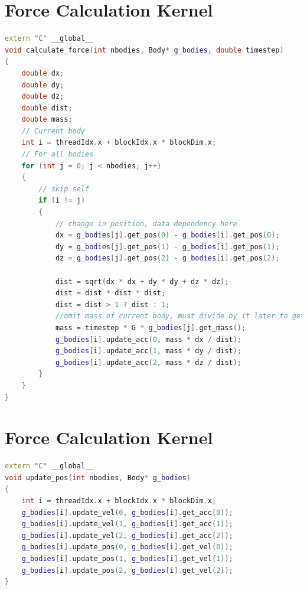 \documentclass[10pt]{IEEEtran}
\newcommand{\?}{\stackrel{?}{=}}
\begin{document}
\newpage

\nocite{*}
\newpage
\begin{appendices}
\onecolumn
\footnotesize
\section{Force Calculation Kernel}
\label{appendix:calc_force}
\begin{lstlisting}[language=C++]
extern "C" __global__
void calculate_force(int nbodies, Body* g_bodies, double timestep)
{
    double dx;
    double dy;
    double dz;
    double dist;
    double mass;
    // Current body
    int i = threadIdx.x + blockIdx.x * blockDim.x;
    // For all bodies
    for (int j = 0; j < nbodies; j++)
    {
        // skip self
        if (i != j)
        {
            // change in position, data dependency here
            dx = g_bodies[j].get_pos(0) - g_bodies[i].get_pos(0);
            dy = g_bodies[j].get_pos(1) - g_bodies[i].get_pos(1);
            dz = g_bodies[j].get_pos(2) - g_bodies[i].get_pos(2);

            dist = sqrt(dx * dx + dy * dy + dz * dz);
            dist = dist * dist * dist;
            dist = dist > 1 ? dist : 1;
            //omit mass of current body, must divide by it later to get accel anyway
            mass = timestep * G * g_bodies[j].get_mass();
            g_bodies[i].update_acc(0, mass * dx / dist);
            g_bodies[i].update_acc(1, mass * dy / dist);
            g_bodies[i].update_acc(2, mass * dz / dist);
        }
    }
}
\end{lstlisting}

\section{Force Calculation Kernel}
\label{appendix:up_pos}
\begin{lstlisting}[language=C++]
extern "C" __global__
void update_pos(int nbodies, Body* g_bodies)
{
    int i = threadIdx.x + blockIdx.x * blockDim.x;
    g_bodies[i].update_vel(0, g_bodies[i].get_acc(0));
    g_bodies[i].update_vel(1, g_bodies[i].get_acc(1));
    g_bodies[i].update_vel(2, g_bodies[i].get_acc(2));
    g_bodies[i].update_pos(0, g_bodies[i].get_vel(0));
    g_bodies[i].update_pos(1, g_bodies[i].get_vel(1));
    g_bodies[i].update_pos(2, g_bodies[i].get_vel(2));
}
\end{lstlisting}

\end{appendices}
\end{document}
